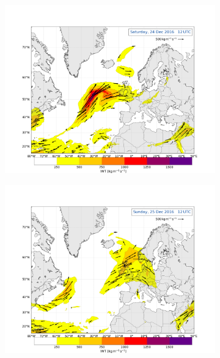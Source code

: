 \begin{figure}
	\begin{subfigure}[b]{0.49\textwidth}
		\includegraphics[trim={4.2cm 3.9cm 4.3cm 5.1cm},clip,
		width=\textwidth]{./fig_Atm_Riv/20161224_12}
		\caption{}\label{fig:AR24}
	\end{subfigure}
	\begin{subfigure}[b]{0.49\textwidth}
		\includegraphics[trim={4.2cm 3.9cm 4.3cm 5.1cm},clip,
		width=\textwidth]{./fig_Atm_Riv/20161225_12}
		\caption{}\label{fig:AR25}
	\end{subfigure}
	\begin{subfigure}[b]{0.49\textwidth}

\end{subfigure}
\end{figure}
